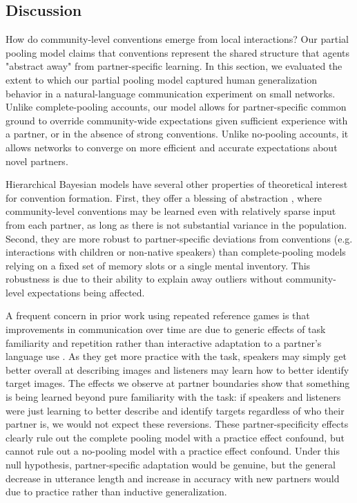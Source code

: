 \subsection{Discussion}

How do community-level conventions emerge from local interactions? 
Our partial pooling model claims that conventions represent the shared structure that agents "abstract away" from partner-specific learning.
In this section, we evaluated the extent to which our partial pooling model captured human generalization behavior in a natural-language communication experiment on small networks.
Unlike complete-pooling accounts, our model allows for partner-specific common ground to override community-wide expectations given sufficient experience with a partner, or in the absence of strong conventions.
Unlike no-pooling accounts, it allows networks to converge on more efficient and accurate expectations about novel partners.

Hierarchical Bayesian models have several other properties of theoretical interest for convention formation.
First, they offer a blessing of abstraction \cite{GoodmanUllmanTenenbaum11_TheoryOfCausality}, where community-level conventions may be learned even with relatively sparse input from each partner, as long as there is not substantial variance in the population. 
Second, they are more robust to partner-specific deviations from conventions (e.g. interactions with children or non-native speakers) than complete-pooling models relying on a fixed set of memory slots or a single mental inventory. 
This robustness is due to their ability to explain away outliers without community-level expectations being affected. 

A frequent concern in prior work using repeated reference games is that improvements in communication over time are due to generic effects of task familiarity and repetition rather than interactive adaptation to a partner's language use \cite{HupetChantraine92_CollaborationOrRepitition}.
As they get more practice with the task, speakers may simply get better overall at describing images and listeners may learn how to better identify target images. 
The effects we observe at partner boundaries show that something is being learned beyond pure familiarity with the task: if speakers and listeners were just learning to better describe and identify targets regardless of who their partner is, we would not expect these reversions.
These partner-specificity effects clearly rule out the complete pooling model with a practice effect confound, but cannot rule out a no-pooling model with a practice effect confound.
Under this null hypothesis, partner-specific adaptation would be genuine, but the general decrease in utterance length and increase in accuracy with new partners would due to practice rather than inductive generalization.

